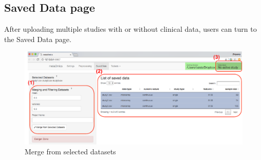 \subsection{Saved Data page}
\label{sec:saved}

After uploading multiple studies with or without clinical data,
users can turn to the Saved Data page.

\begin{figure}[H]
\begin{center}
\includegraphics[scale=0.9]{./figure/preprocessing/GUImerge.pdf}
\caption{Merge from selected datasets}
\label{fig:GUImerge}
\end{center}
\end{figure}


